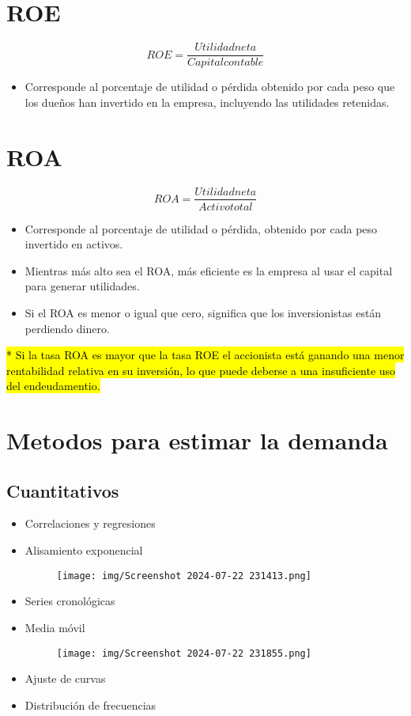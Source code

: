 \documentclass{templateNote}
\begin{document}
\section{ROE}
\begin{equation*}
    ROE = \frac{Utilidad neta}{Capital contable}
\end{equation*}
\begin{itemize}
    \item Corresponde al porcentaje de utilidad o pérdida obtenido por cada peso que los dueños han invertido en la empresa, incluyendo las utilidades retenidas.
\end{itemize}

\section{ROA}
\begin{equation*}
    ROA = \frac{Utilidad neta}{Activo total}
\end{equation*}
\begin{itemize}
    \item Corresponde al porcentaje de utilidad o pérdida, obtenido por cada peso invertido en activos.
    \item Mientras más alto sea el ROA, más eficiente es la empresa al usar el capital para generar utilidades.
    \item Si el ROA es menor o igual que cero, significa que los inversionistas están perdiendo dinero.
\end{itemize}

\hl{* Si la tasa ROA es mayor que la tasa ROE el accionista está ganando una menor rentabilidad relativa en su inversión, lo que puede deberse a una insuficiente uso del endeudamentio.}

\section{Metodos para estimar la demanda}
\subsection{Cuantitativos}
\begin{itemize}
    \item Correlaciones y regresiones
    \item Alisamiento exponencial
    \begin{figure}[H]
        \centering
        \texttt{[image: img/Screenshot 2024-07-22 231413.png]}
    \end{figure}

    \item Series cronológicas
    \item Media móvil
    \begin{figure}[H]
        \centering
        \texttt{[image: img/Screenshot 2024-07-22 231855.png]}
    \end{figure}
    \item Ajuste de curvas
    \item Distribución de frecuencias
\end{itemize}
\end{document}
